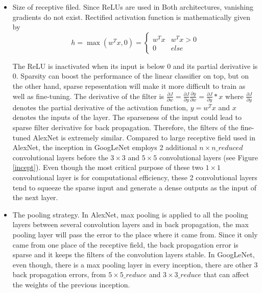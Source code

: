 \begin{itemize}
  \item Size of receptive filed. Since ReLUs are used in Both architectures, vanishing gradients do not exist. Rectified activation function is mathematically given by
      \begin{equation}\label{relu}
        h = \max ({w^T}x,0) = \left\{ {\begin{array}{*{20}{c}}
{{w^T}x}&{{w^T}x > 0}\\
0&{else}
\end{array}} \right.
      \end{equation}

    The ReLU is inactivated when its input is below 0 and its partial derivative is 0. Sparsity can boost the performance of the linear classifier on top, but on the other hand, sparse repesentation will make it more difficult to train as well as fine-tuning. The derivative of the filter is $\frac{{\partial J}}{{\partial w}} = \frac{{\partial J}}{{\partial y}}\frac{{\partial y}}{{\partial w}} = \frac{{\partial J}}{{\partial y}}*x$ where $\frac{{\partial J}}{{\partial y}}$ denotes the partial derivative of the activation function, $y=w^Tx$ and $x$ denotes the inputs of the layer. The sparseness of the input could lead to sparse filter derivative for back propagation. Therefore, the filters of the fine-tuned AlexNet is extremely similar. Compared to large receptive field used in AlexNet, the inception in GoogLeNet employs 2 additional $n\times n\_reduced$ convolutional layers before the $3\times 3$ and $5\times 5$ convolutional layers (see Figure \ref{incept}). Even though the most critical purpose of these two $1\times 1$ convolutional layer is for computational efficiency, these 2 convolutional layers tend to squeeze the sparse input and generate a dense outputs as the input of the next layer.
  \item The pooling strategy. In AlexNet, max pooling is applied to all the pooling layers between several convolution layers and in back propagation, the max pooling layer will pass the error to the place where it came from. Since it only came from one place of the receptive field, the back propagation error is sparse and it keeps the filters of the convolution layers stable. In GoogLeNet, even though, there is a max pooling layer in every inception, there are other 3 back propagation errors, from $5\times 5\_reduce$ and $3\times 3\_reduce$ that can affect the weights of the previous inception.
\end{itemize}
